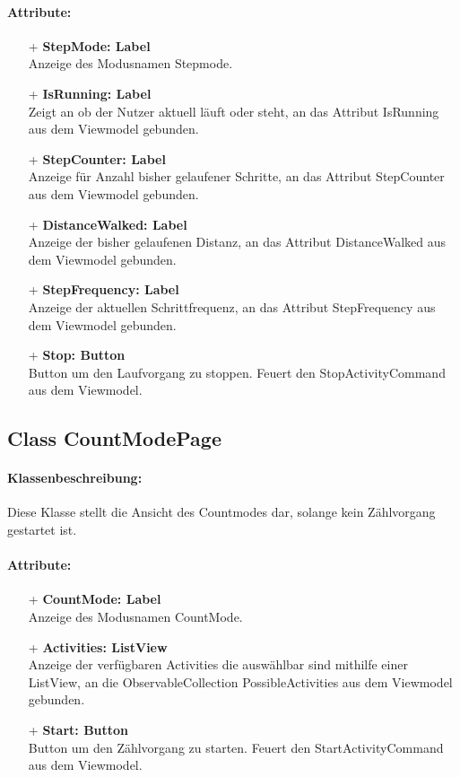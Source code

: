 \documentclass[a4paper,12pt]{article}
\begin{document}
\paragraph{Attribute:}
	\begin{itemize}
	\item[+] \textbf{StepMode: Label} \\ Anzeige des Modusnamen Stepmode.
	\item[+] \textbf{IsRunning: Label} \\ Zeigt an ob der Nutzer aktuell läuft oder steht, an das Attribut IsRunning aus dem Viewmodel gebunden.
	\item[+] \textbf{StepCounter: Label} \\ Anzeige für Anzahl bisher gelaufener Schritte, an das Attribut StepCounter aus dem Viewmodel gebunden.
	\item[+] \textbf{DistanceWalked: Label} \\ Anzeige der bisher gelaufenen Distanz, an das Attribut DistanceWalked aus dem Viewmodel gebunden.
	\item[+] \textbf{StepFrequency: Label} \\ Anzeige der aktuellen Schrittfrequenz, an das Attribut StepFrequency aus dem Viewmodel gebunden.
	\item[+] \textbf{Stop: Button} \\ Button um den Laufvorgang zu stoppen. Feuert den StopActivityCommand aus dem Viewmodel.
	\end{itemize}
	
\subsection{Class CountModePage}
\paragraph{Klassenbeschreibung:}
Diese Klasse stellt die Ansicht des Countmodes dar, solange kein Zählvorgang gestartet ist.
\paragraph{Attribute:}
	\begin{itemize}
	\item[+] \textbf{CountMode: Label} \\ Anzeige des Modusnamen CountMode.
	\item[+] \textbf{Activities: ListView} \\ Anzeige der verfügbaren Activities die auswählbar sind mithilfe einer ListView, an die ObservableCollection PossibleActivities aus dem Viewmodel gebunden.
	\item[+] \textbf{Start: Button} \\ Button um den Zählvorgang zu starten. Feuert den StartActivityCommand aus dem Viewmodel.
	\end{itemize}
\end{document}
